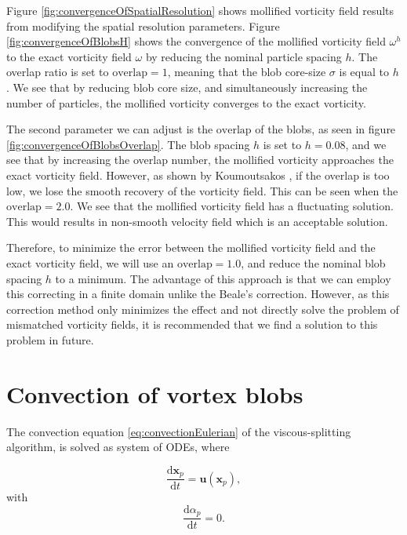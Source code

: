 Figure \ref{fig:convergenceOfSpatialResolution} shows mollified vorticity field results from modifying the spatial resolution parameters. Figure \ref{fig:convergenceOfBlobsH} shows the convergence of the mollified vorticity field $\omega^h$ to the exact vorticity field $\omega$ by reducing the nominal particle spacing $h$. The overlap ratio is set to $\mathrm{overlap} = 1$, meaning that the blob core-size $\sigma$ is equal to $h$. We see that by reducing blob core size, and simultaneously increasing the number of particles, the mollified vorticity converges to the exact vorticity. 

The second parameter we can adjust is the $\mathrm{overlap}$ of the blobs, as seen in figure \ref{fig:convergenceOfBlobsOverlap}. The blob spacing $h$ is set to $h = 0.08$, and we see that by increasing the overlap number, the mollified vorticity approaches the exact vorticity field. However, as shown by Koumoutsakos \cite{Cottet2000a}, if the overlap is too low, we lose the smooth recovery of the vorticity field. This can be seen when the $\mathrm{overlap} = 2.0$. We see that the mollified vorticity field has a fluctuating solution. This would results in non-smooth velocity field which is an acceptable solution.

Therefore, to minimize the error between the mollified vorticity field and the exact vorticity field, we will use an $\mathrm{overlap} = 1.0$, and reduce the nominal blob spacing $h$ to a minimum. The advantage of this approach is that we can employ this correcting in a finite domain unlike the Beale's correction. However, as this correction method only minimizes the effect and not directly solve the problem of mismatched vorticity fields, it is recommended that we find a solution to this problem in future.

\section{Convection of vortex blobs}

The convection equation \ref{eq:convectionEulerian} of the viscous-splitting algorithm, is solved as system of ODEs, where

	\begin{equation}
	\frac{\mathrm{d}\mathbf{x}_p}{\mathrm{d}t} = \mathbf{u}\left(\mathbf{x}_p\right),
	\label{eq:convectionODE}
	\end{equation}
with
	\begin{equation}
	\frac{\mathrm{d}\alpha_p}{\mathrm{d}t} = 0.
	\label{eq:conservationODE}
	\end{equation}

